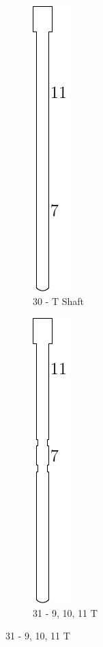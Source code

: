 \documentclass[openany]{book}
\begin{document}
\begin{figure}[!ht]
	\centering
	\begin{subfigure}{.2\textwidth}
		\centering
		\includegraphics[scale=1]{images/transmission-shaft-gear.pdf}
		\caption{30 - T Shaft}
		\label{fig:transmission:shaftgear}	
	\end{subfigure}
	\begin{subfigure}{.2\textwidth}
		\centering
		\includegraphics[scale=1]{images/transmission-result-9-gear.pdf}
		\caption{31 - 9, 10, 11 T}
		\label{fig:transmission:9gear}	
	\end{subfigure}

\end{figure}
\end{document}
